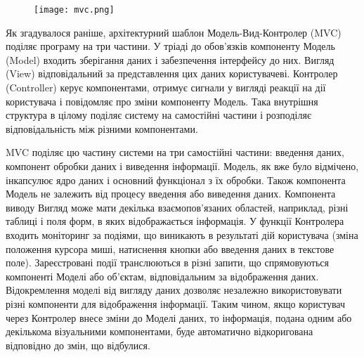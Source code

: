 \begin{figure}[!ht]
\centering
		\texttt{[image: mvc.png]}
		\vspace{18pt}
		\label{pic:mvc}
\end{figure}

\par Як згадувалося раніше, архітектурний шаблон Модель-Вид-Контролер (MVC) поділяє програму на три частини. У тріаді до обов'язків компоненту Модель (Model) входить зберігання даних і забезпечення інтерфейсу до них. Вигляд (View) відповідальний за представлення цих даних користувачеві. Контролер (Controller) керує компонентами, отримує сигнали у вигляді реакції на дії користувача і повідомляє про зміни компоненту Модель. Така внутрішня структура в цілому поділяє систему на самостійні частини і розподіляє відповідальність між різними компонентами.
\par MVC поділяє цю частину системи на три самостійні частини: введення даних, компонент обробки даних і виведення інформації. Модель, як вже було відмічено, інкапсулює ядро даних і основний функціонал з їх обробки. Також компонента Модель не залежить від процесу введення або виведення даних. Компонента виводу Вигляд може мати декілька взаємопов'язаних областей, наприклад, різні таблиці і поля форм, в яких відображається інформація. У функції Контролера входить моніторинг за подіями, що виникають в результаті дій користувача (зміна положення курсора миші, натиснення кнопки або введення даних в текстове поле).
Зареєстровані події транслюються в різні запити, що спрямовуються компоненті Моделі або об'єктам, відповідальним за відображення даних. Відокремлення моделі від вигляду даних дозволяє незалежно використовувати різні компоненти для відображення інформації. Таким чином, якщо користувач через Контролер внесе зміни до Моделі даних, то інформація, подана одним або декількома візуальними компонентами, буде автоматично відкоригована відповідно до змін, що відбулися.



